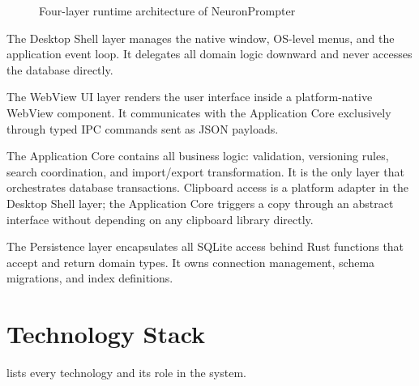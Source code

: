\documentclass[a4paper, 11pt, oneside]{report}
\begin{document}
\begin{figure}[H]
  \caption{Four-layer runtime architecture of NeuronPrompter}
  \label{fig:layers}
\end{figure}

The Desktop Shell layer manages the native window, OS-level menus, and the
application event loop.  It delegates all domain logic downward and never
accesses the database directly.

The WebView UI layer renders the user interface inside a platform-native
WebView component.  It communicates with the Application Core exclusively
through typed IPC commands sent as JSON payloads.

The Application Core contains all business logic: validation, versioning
rules, search coordination, and import/export transformation.  It is the
only layer that orchestrates database transactions.  Clipboard access is a
platform adapter in the Desktop Shell layer; the Application Core triggers
a copy through an abstract interface without depending on any clipboard
library directly.

The Persistence layer encapsulates all SQLite access behind Rust functions
that accept and return domain types.  It owns connection management,
schema migrations, and index definitions.

\section{Technology Stack}
\label{sec:tech-stack}

 lists every technology and its role in the system.
\end{document}
